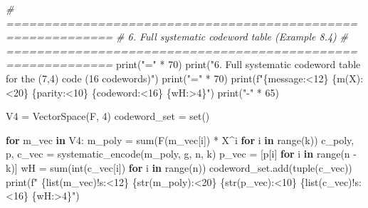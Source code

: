 \documentclass[
]{article}
\newenvironment{Shaded}{}{}
\newcommand{\BuiltInTok}[1]{\textcolor[rgb]{0.00,0.50,0.00}{#1}}
\newcommand{\CommentTok}[1]{\textcolor[rgb]{0.38,0.63,0.69}{\textit{#1}}}
\newcommand{\ControlFlowTok}[1]{\textcolor[rgb]{0.00,0.44,0.13}{\textbf{#1}}}
\newcommand{\DecValTok}[1]{\textcolor[rgb]{0.25,0.63,0.44}{#1}}
\newcommand{\KeywordTok}[1]{\textcolor[rgb]{0.00,0.44,0.13}{\textbf{#1}}}
\newcommand{\NormalTok}[1]{#1}
\newcommand{\OperatorTok}[1]{\textcolor[rgb]{0.40,0.40,0.40}{#1}}
\newcommand{\SpecialCharTok}[1]{\textcolor[rgb]{0.25,0.44,0.63}{#1}}
\newcommand{\SpecialStringTok}[1]{\textcolor[rgb]{0.73,0.40,0.53}{#1}}
\newcommand{\StringTok}[1]{\textcolor[rgb]{0.25,0.44,0.63}{#1}}
\begin{document}
\begin{Shaded}
\begin{Highlighting}[]
\CommentTok{\# ============================================================}
\CommentTok{\# 6. Full systematic codeword table (Example 8.4)}
\CommentTok{\# ============================================================}
\BuiltInTok{print}\NormalTok{(}\StringTok{"="} \OperatorTok{*} \DecValTok{70}\NormalTok{)}
\BuiltInTok{print}\NormalTok{(}\StringTok{"6. Full systematic codeword table for the (7,4) code (16 codewords)"}\NormalTok{)}
\BuiltInTok{print}\NormalTok{(}\StringTok{"="} \OperatorTok{*} \DecValTok{70}\NormalTok{)}
\BuiltInTok{print}\NormalTok{(}\SpecialStringTok{f"}\SpecialCharTok{\{}\StringTok{\textquotesingle{}message\textquotesingle{}}\SpecialCharTok{:\textless{}12\}}\SpecialStringTok{ }\SpecialCharTok{\{}\StringTok{\textquotesingle{}m(X)\textquotesingle{}}\SpecialCharTok{:\textless{}20\}}\SpecialStringTok{ }\SpecialCharTok{\{}\StringTok{\textquotesingle{}parity\textquotesingle{}}\SpecialCharTok{:\textless{}10\}}\SpecialStringTok{ }\SpecialCharTok{\{}\StringTok{\textquotesingle{}codeword\textquotesingle{}}\SpecialCharTok{:\textless{}16\}}\SpecialStringTok{ }\SpecialCharTok{\{}\StringTok{\textquotesingle{}wH\textquotesingle{}}\SpecialCharTok{:\textgreater{}4\}}\SpecialStringTok{"}\NormalTok{)}
\BuiltInTok{print}\NormalTok{(}\StringTok{"{-}"} \OperatorTok{*} \DecValTok{65}\NormalTok{)}

\NormalTok{V4 }\OperatorTok{=}\NormalTok{ VectorSpace(F, }\DecValTok{4}\NormalTok{)}
\NormalTok{codeword\_set }\OperatorTok{=} \BuiltInTok{set}\NormalTok{()}

\ControlFlowTok{for}\NormalTok{ m\_vec }\KeywordTok{in}\NormalTok{ V4:}
\NormalTok{    m\_poly }\OperatorTok{=} \BuiltInTok{sum}\NormalTok{(F(m\_vec[i]) }\OperatorTok{*}\NormalTok{ X}\OperatorTok{\^{}}\NormalTok{i }\ControlFlowTok{for}\NormalTok{ i }\KeywordTok{in} \BuiltInTok{range}\NormalTok{(k))}
\NormalTok{    c\_poly, p, c\_vec }\OperatorTok{=}\NormalTok{ systematic\_encode(m\_poly, g, n, k)}
\NormalTok{    p\_vec }\OperatorTok{=}\NormalTok{ [p[i] }\ControlFlowTok{for}\NormalTok{ i }\KeywordTok{in} \BuiltInTok{range}\NormalTok{(n }\OperatorTok{{-}}\NormalTok{ k)]}
\NormalTok{    wH }\OperatorTok{=} \BuiltInTok{sum}\NormalTok{(}\BuiltInTok{int}\NormalTok{(c\_vec[i]) }\ControlFlowTok{for}\NormalTok{ i }\KeywordTok{in} \BuiltInTok{range}\NormalTok{(n))}
\NormalTok{    codeword\_set.add(}\BuiltInTok{tuple}\NormalTok{(c\_vec))}
    \BuiltInTok{print}\NormalTok{(}\SpecialStringTok{f"  }\SpecialCharTok{\{}\BuiltInTok{list}\NormalTok{(m\_vec)}\SpecialCharTok{!s:\textless{}12\}}\SpecialStringTok{ }\SpecialCharTok{\{}\BuiltInTok{str}\NormalTok{(m\_poly)}\SpecialCharTok{:\textless{}20\}}\SpecialStringTok{ }\SpecialCharTok{\{}\BuiltInTok{str}\NormalTok{(p\_vec)}\SpecialCharTok{:\textless{}10\}}\SpecialStringTok{ }\SpecialCharTok{\{}\BuiltInTok{list}\NormalTok{(c\_vec)}\SpecialCharTok{!s:\textless{}16\}}\SpecialStringTok{ }\SpecialCharTok{\{}\NormalTok{wH}\SpecialCharTok{:\textgreater{}4\}}\SpecialStringTok{"}\NormalTok{)}


\end{Highlighting}
\end{Shaded}
\end{document}
